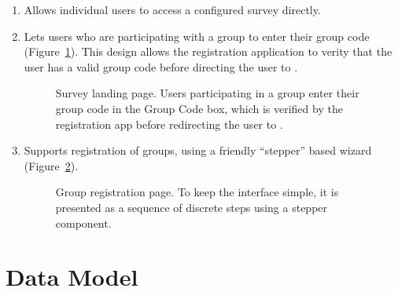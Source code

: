 \documentclass{article}
\begin{document}
\begin{enumerate}
\item
  Allows individual users to access a configured survey directly.
\item
  Lets users who are participating with a group to enter their
  group code (Figure~\ref{fig:survey-landing-page}).
  This design allows the registration application
  to verity that the user has a valid group code
  before directing the user to \qual.
  \begin{figure}
    \centering
    \caption{
      Survey landing page.
      Users participating in a group
      enter their group code
      in the \textsf{Group Code} box,
      which is verified by the registration app
      before redirecting the user to \qual.
    }
    \label{fig:survey-landing-page}
  \end{figure}
\item
  Supports registration of groups,
  using a friendly ``stepper'' based wizard
  (Figure~\ref{fig:group-registration}).
  \begin{figure}
    \centering
    \caption{
      Group registration page.
      To keep the interface simple,
      it is presented as a sequence of discrete steps
      using a \vue{} stepper component.
    }
    \label{fig:group-registration}
  \end{figure}
\end{enumerate}

\section{Data Model}
\label{sec:data-model-overview}
\end{document}
